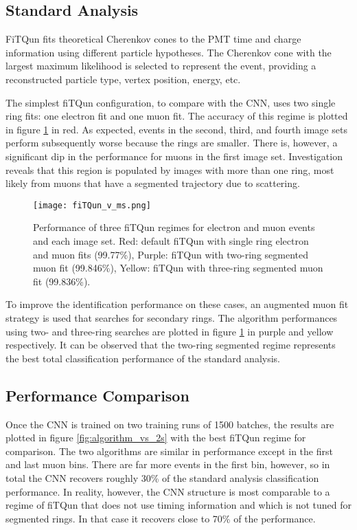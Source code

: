\documentclass[twoside,twocolumn]{article}
\begin{document}
\subsection{Standard Analysis}

FiTQun fits theoretical Cherenkov cones to the PMT time and charge information using different particle hypotheses. The Cherenkov cone with the largest maximum likelihood is selected to represent the event, providing a reconstructed particle type, vertex position, energy, etc.

The simplest fiTQun configuration, to compare with the CNN, uses two single ring fits: one electron fit and one muon fit. The accuracy of this regime is plotted in figure \ref{fig:fiTQun_v_ms} in red. As expected, events in the second, third, and fourth image sets perform subsequently worse because the rings are smaller. There is, however, a significant dip in the performance for muons in the first image set. Investigation reveals that this region is populated by images with more than one ring, most likely from muons that have a segmented trajectory due to scattering.

\begin{figure}[ht]
    \centering
    \texttt{[image: fiTQun\_v\_ms.png]}
    \caption{Performance of three fiTQun regimes for electron and muon events and each image set. Red: default fiTQun with single ring electron and muon fits (99.77\%), Purple: fiTQun with two-ring segmented muon fit (99.846\%), Yellow: fiTQun with three-ring segmented muon fit (99.836\%).}
    \label{fig:fiTQun_v_ms}
\end{figure}

To improve the identification performance on these cases, an augmented muon fit strategy is used that searches for secondary rings. The algorithm performances using two- and three-ring searches are plotted in figure \ref{fig:fiTQun_v_ms} in purple and yellow respectively. It can be observed that the two-ring segmented regime represents the best total classification performance of the standard analysis.

\subsection{Performance Comparison}

Once the CNN is trained on two training runs of 1500 batches, the results are plotted in figure \ref{fig:algorithm_vs_2s} with the best fiTQun regime for comparison. The two algorithms are similar in performance except in the first and last muon bins. There are far more events in the first bin, however, so in total the CNN recovers roughly 30\% of the standard analysis classification performance. In reality, however, the CNN structure is most comparable to a regime of fiTQun that does not use timing information and which is not tuned for segmented rings. In that case it recovers close to 70\% of the performance.
\end{document}
